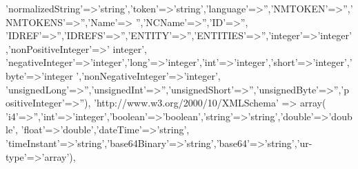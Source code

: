 \begin{DoxyCode}
        \textcolor{stringliteral}{'normalizedString'}=>\textcolor{stringliteral}{'string'},\textcolor{stringliteral}{'token'}=>\textcolor{stringliteral}{'string'},\textcolor{stringliteral}{'language'}=>\textcolor{stringliteral}{''},\textcolor{stringliteral}{'NMTOKEN'}=>\textcolor{stringliteral}{''},\textcolor{stringliteral}{'NMTOKENS'}=>\textcolor{stringliteral}{''},\textcolor{stringliteral}{'Name'}=>\textcolor{stringliteral}{
      ''},\textcolor{stringliteral}{'NCName'}=>\textcolor{stringliteral}{''},\textcolor{stringliteral}{'ID'}=>\textcolor{stringliteral}{''},
        \textcolor{stringliteral}{'IDREF'}=>\textcolor{stringliteral}{''},\textcolor{stringliteral}{'IDREFS'}=>\textcolor{stringliteral}{''},\textcolor{stringliteral}{'ENTITY'}=>\textcolor{stringliteral}{''},\textcolor{stringliteral}{'ENTITIES'}=>\textcolor{stringliteral}{''},\textcolor{stringliteral}{'integer'}=>\textcolor{stringliteral}{'integer'},\textcolor{stringliteral}{'nonPositiveInteger'}=>\textcolor{stringliteral}{'
      integer'},
        \textcolor{stringliteral}{'negativeInteger'}=>\textcolor{stringliteral}{'integer'},\textcolor{stringliteral}{'long'}=>\textcolor{stringliteral}{'integer'},\textcolor{stringliteral}{'int'}=>\textcolor{stringliteral}{'integer'},\textcolor{stringliteral}{'short'}=>\textcolor{stringliteral}{'integer'},\textcolor{stringliteral}{'byte'}=>\textcolor{stringliteral}{'integer
      '},\textcolor{stringliteral}{'nonNegativeInteger'}=>\textcolor{stringliteral}{'integer'},
        \textcolor{stringliteral}{'unsignedLong'}=>\textcolor{stringliteral}{''},\textcolor{stringliteral}{'unsignedInt'}=>\textcolor{stringliteral}{''},\textcolor{stringliteral}{'unsignedShort'}=>\textcolor{stringliteral}{''},\textcolor{stringliteral}{'unsignedByte'}=>\textcolor{stringliteral}{''},\textcolor{stringliteral}{'positiveInteger'}=>\textcolor{stringliteral}{''}),
    \textcolor{stringliteral}{'http://www.w3.org/2000/10/XMLSchema'} => array(
        \textcolor{stringliteral}{'i4'}=>\textcolor{stringliteral}{''},\textcolor{stringliteral}{'int'}=>\textcolor{stringliteral}{'integer'},\textcolor{stringliteral}{'boolean'}=>\textcolor{stringliteral}{'boolean'},\textcolor{stringliteral}{'string'}=>\textcolor{stringliteral}{'string'},\textcolor{stringliteral}{'double'}=>\textcolor{stringliteral}{'double'},
        \textcolor{stringliteral}{'float'}=>\textcolor{stringliteral}{'double'},\textcolor{stringliteral}{'dateTime'}=>\textcolor{stringliteral}{'string'},
        \textcolor{stringliteral}{'timeInstant'}=>\textcolor{stringliteral}{'string'},\textcolor{stringliteral}{'base64Binary'}=>\textcolor{stringliteral}{'string'},\textcolor{stringliteral}{'base64'}=>\textcolor{stringliteral}{'string'},\textcolor{stringliteral}{'ur-type'}=>\textcolor{stringliteral}{'array'}),

\end{DoxyCode}
